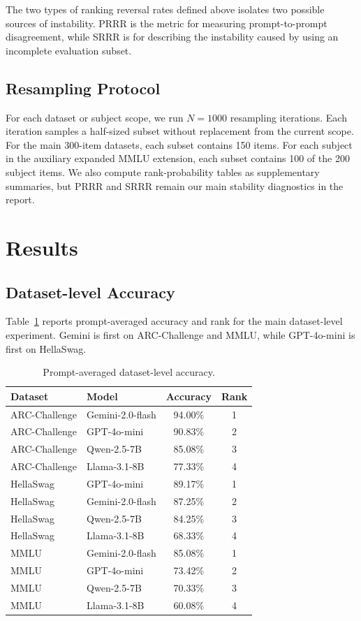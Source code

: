 \documentclass[11pt]{article}
\theoremstyle{definition}
\begin{document}
The two types of ranking reversal rates defined above isolates two possible sources of instability. PRRR is the metric for measuring prompt-to-prompt disagreement, while SRRR is for describing the instability caused by using an incomplete evaluation subset.

\subsection{Resampling Protocol}

For each dataset or subject scope, we run $N=1000$ resampling iterations. Each iteration samples a half-sized subset without replacement from the current scope. For the main 300-item datasets, each subset contains 150 items. For each subject in the auxiliary expanded MMLU extension, each subset contains 100 of the 200 subject items. We also compute rank-probability tables as supplementary summaries, but PRRR and SRRR remain our main stability diagnostics in the report.

\section{Results}\label{section5Results}

\subsection{Dataset-level Accuracy}

Table~\ref{tab:acc} reports prompt-averaged accuracy and rank for the main dataset-level experiment. Gemini is first on ARC-Challenge and MMLU, while GPT-4o-mini is first on HellaSwag.

\begin{table}[H]
\centering
\begin{tabular}{@{}llcc@{}}
\toprule
\textbf{Dataset} & \textbf{Model} & \textbf{Accuracy} & \textbf{Rank} \\
\midrule
ARC-Challenge & Gemini-2.0-flash & 94.00\% & 1 \\
ARC-Challenge & GPT-4o-mini & 90.83\% & 2 \\
ARC-Challenge & Qwen-2.5-7B & 85.08\% & 3 \\
ARC-Challenge & Llama-3.1-8B & 77.33\% & 4 \\
\midrule
HellaSwag & GPT-4o-mini & 89.17\% & 1 \\
HellaSwag & Gemini-2.0-flash & 87.25\% & 2 \\
HellaSwag & Qwen-2.5-7B & 84.25\% & 3 \\
HellaSwag & Llama-3.1-8B & 68.33\% & 4 \\
\midrule
MMLU & Gemini-2.0-flash & 85.08\% & 1 \\
MMLU & GPT-4o-mini & 73.42\% & 2 \\
MMLU & Qwen-2.5-7B & 70.33\% & 3 \\
MMLU & Llama-3.1-8B & 60.08\% & 4 \\
\bottomrule
\end{tabular}
\caption{Prompt-averaged dataset-level accuracy.}
\label{tab:acc}
\end{table}
\end{document}
